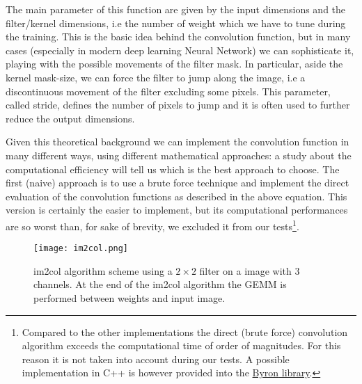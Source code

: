 \documentclass{standalone}
\begin{document}
The main parameter of this function are given by the input dimensions and the filter/kernel dimensions, i.e the number of weight which we have to tune during the training.
This is the basic idea behind the convolution function, but in many cases (especially in modern deep learning Neural Network) we can sophisticate it, playing with the possible movements of the filter mask.
In particular, aside the kernel mask-size, we can force the filter to jump along the image, i.e a discontinuous movement of the filter excluding some pixels.
This parameter, called \textsf{stride}, defines the number of pixels to jump and it is often used to further reduce the output dimensions.

Given this theoretical background we can implement the convolution function in many different ways, using different mathematical approaches: a study about the computational efficiency will tell us which is the best approach to choose.
The first (naive) approach is to use a brute force technique and implement the direct evaluation of the convolution functions as described in the above equation.
This version is certainly the easier to implement, but its computational performances are so worst than, for sake of brevity, we excluded it from our tests\footnote{
  Compared to the other implementations the direct (brute force) convolution algorithm exceeds the computational time of order of magnitudes.
  For this reason it is not taken into account during our tests.
  A possible implementation in \textsf{C++} is however provided into the \href{https://github.com/Nico-Curti/Byron/blob/master/utility/winograd_test.cpp}{\textsf{Byron} library}.
}.

\begin{center}
\begin{figure}[htbp]
\centering
\texttt{[image: im2col.png]}
\caption{\textsf{im2col} algorithm scheme using a $2\times2$ filter on a image with 3 channels.
At the end of the \textsf{im2col} algorithm the \textsf{GEMM} is performed between weights and input image.
}
\label{fig:im2col}
\end{figure}
\end{center}
\end{document}
